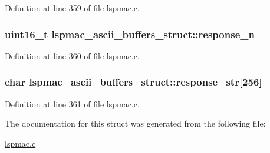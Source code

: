 Definition at line 359 of file lspmac.\-c.

\hypertarget{structlspmac__ascii__buffers__struct_a97c2fdd21eec29c2cba993e361c3c069}{
\subsubsection[{response\-\_\-n}]{\setlength{\rightskip}{0pt plus 5cm}uint16\-\_\-t lspmac\-\_\-ascii\-\_\-buffers\-\_\-struct\-::response\-\_\-n}}\label{structlspmac__ascii__buffers__struct_a97c2fdd21eec29c2cba993e361c3c069}


Definition at line 360 of file lspmac.\-c.

\hypertarget{structlspmac__ascii__buffers__struct_a32c4baecf20143eb71d348b6b5679039}{
\subsubsection[{response\-\_\-str}]{\setlength{\rightskip}{0pt plus 5cm}char lspmac\-\_\-ascii\-\_\-buffers\-\_\-struct\-::response\-\_\-str\mbox{[}256\mbox{]}}}\label{structlspmac__ascii__buffers__struct_a32c4baecf20143eb71d348b6b5679039}


Definition at line 361 of file lspmac.\-c.



The documentation for this struct was generated from the following file\-:\begin{DoxyCompactItemize}
\item 
\hyperlink{lspmac_8c}{lspmac.\-c}\end{DoxyCompactItemize}
